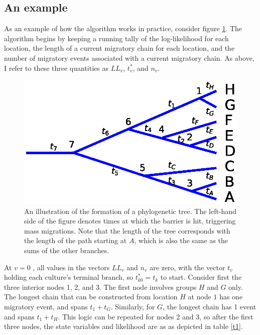\documentclass[11pt]{article}
\begin{document}
\subsection{An example}
As an example of how the algorithm works in practice, consider figure \ref{afig}. The algorithm begins by keeping a running tally of the log-likelihood for each location, the length of a current migratory chain for each location, and the number of migratory events associated with a current migratory chain. As above, I refer to these three quantities as $LL_v$, $t_v^*$, and $n_v$. 
\begin{figure}
\begin{center}
\includegraphics[width=\textwidth]{AncillaryFiles//algofig.eps}
\caption{An illustration of the formation of a phylogenetic tree. The left-hand side of the figure denotes times at which the barrier is hit, triggering mass migrations. Note that the length of the tree corresponds with the length of the path starting at $A$, which is also the same as the sums of the other branches.} \label{afig}
\end{center} 
\end{figure}

At $v=0$ , all values in the vectors $LL_v$ and $n_v$ are zero, with the vector $t_v$ holding each culture's terminal branch, so $t_{k0}^*=t_k$ to start. Consider first the three interior nodes 1, 2, and 3. The first node involves groups $H$ and $G$ only. The longest chain that can be constructed from location $H$ at node $1$ has one migratory event, and spans $t_1+t_G$. Similarly, for $G$, the longest chain has 1 event and spans $t_1+t_H$. This logic can be repeated for nodes 2 and 3, so after the first three nodes, the state variables and likelihood are as as depicted in table \ref{t1}.
\end{document}
